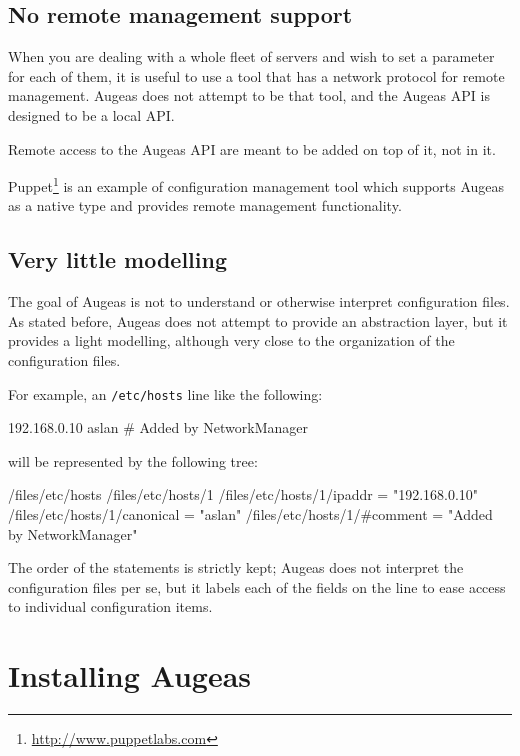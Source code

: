 \subsection{No remote management support}

When you are dealing with a whole fleet of servers and wish to set a parameter for each of them, it is useful to use a tool that has a network protocol for remote management. Augeas does not attempt to be that tool, and the Augeas API is designed to be a local API.

Remote access to the Augeas API are meant to be added on top of it, not in it.

Puppet\footnote{\url{http://www.puppetlabs.com}} is an example of configuration management tool which supports Augeas as a native type and provides remote management functionality.

\subsection{Very little modelling}

The goal of Augeas is not to understand or otherwise interpret configuration files. As stated before, Augeas does not attempt to provide an abstraction layer, but it provides a light modelling, although very close to the organization of the configuration files.

For example, an \nolinkurl{/etc/hosts} line like the following:

\begin{bash}[]
192.168.0.10    aslan   # Added by NetworkManager
\end{bash}

will be represented by the following tree:

\begin{augtoolsh}[]
/files/etc/hosts
/files/etc/hosts/1
/files/etc/hosts/1/ipaddr = "192.168.0.10"
/files/etc/hosts/1/canonical = "aslan"
/files/etc/hosts/1/#comment = "Added by NetworkManager"
\end{augtoolsh}

The order of the statements is strictly kept; Augeas does not interpret the configuration files per se, but it labels each of the fields on the line to ease access to individual configuration items.

\section{Installing Augeas}

